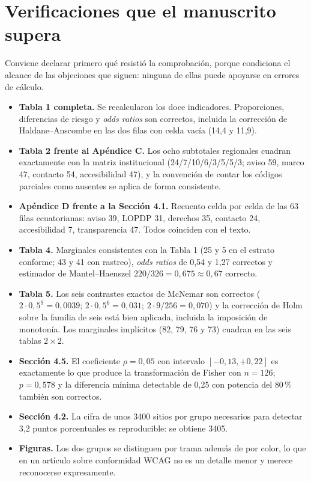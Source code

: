 \documentclass[11pt,a4paper]{article}
\begin{document}
\section{Verificaciones que el manuscrito supera}

Conviene declarar primero qu\'e resisti\'o la comprobaci\'on, porque condiciona el alcance de las objeciones que siguen: ninguna de ellas puede apoyarse en errores de c\'alculo.

\begin{itemize}
	\item \textbf{Tabla 1 completa.} Se recalcularon los doce indicadores. Proporciones, diferencias de riesgo y \emph{odds ratios} son correctos, incluida la correcci\'on de Haldane--Anscombe en las dos filas con celda vac\'ia (14,4 y 11,9).
	\item \textbf{Tabla 2 frente al Ap\'endice C.} Los ocho subtotales regionales cuadran exactamente con la matriz institucional (24/7/10/6/3/5/5/3; aviso 59, marco 47, contacto 54, accesibilidad 47), y la convenci\'on de contar los c\'odigos parciales como ausentes se aplica de forma consistente.
	\item \textbf{Ap\'endice D frente a la Secci\'on 4.1.} Recuento celda por celda de las 63 filas ecuatorianas: aviso 39, LOPDP 31, derechos 35, contacto 24, accesibilidad 7, transparencia 47. Todos coinciden con el texto.
	\item \textbf{Tabla 4.} Marginales consistentes con la Tabla 1 (25 y 5 en el estrato conforme; 43 y 41 con rastreo), \emph{odds ratios} de 0,54 y 1,27 correctos y estimador de Mantel--Haenszel $220/326 = 0{,}675 \approx 0{,}67$ correcto.
	\item \textbf{Tabla 5.} Los seis contrastes exactos de McNemar son correctos ($2 \cdot 0{,}5^{9} = 0{,}0039$; $2 \cdot 0{,}5^{6} = 0{,}031$; $2 \cdot 9/256 = 0{,}070$) y la correcci\'on de Holm sobre la familia de seis est\'a bien aplicada, incluida la imposici\'on de monoton\'ia. Los marginales impl\'icitos (82, 79, 76 y 73) cuadran en las seis tablas $2 \times 2$.
	\item \textbf{Secci\'on 4.5.} El coeficiente $\rho = 0{,}05$ con intervalo $[-0{,}13, +0{,}22]$ es exactamente lo que produce la transformaci\'on de Fisher con $n = 126$; $p = 0{,}578$ y la diferencia m\'inima detectable de 0,25 con potencia del 80\,\% tambi\'en son correctos.
	\item \textbf{Secci\'on 4.2.} La cifra de unos 3400 sitios por grupo necesarios para detectar 3,2 puntos porcentuales es reproducible: se obtiene 3405.
	\item \textbf{Figuras.} Los dos grupos se distinguen por trama adem\'as de por color, lo que en un art\'iculo sobre conformidad WCAG no es un detalle menor y merece reconocerse expresamente.
\end{itemize}
\end{document}

